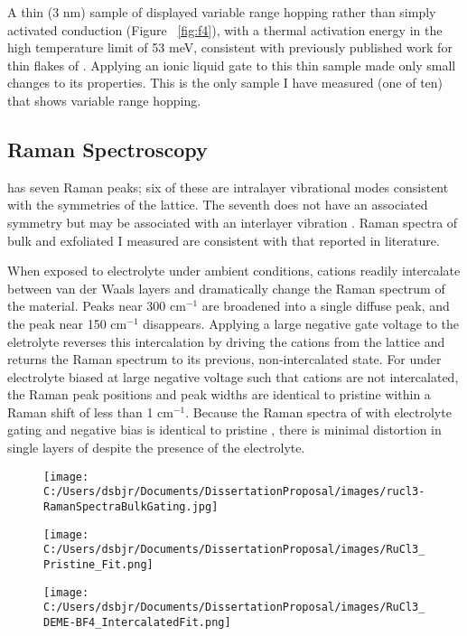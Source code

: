 \documentclass[11pt]{article}
\begin{document}
A thin (3 nm) sample of \rucl displayed variable range hopping rather than simply activated conduction (Figure ~\ref{fig:f4}), with a thermal activation energy in the high temperature limit of 53 meV, consistent with previously published work for thin flakes of \rucl \cite{Mashhadi2018}. Applying an ionic liquid gate to this thin sample made only small changes to its properties. This is the only sample I have measured (one of ten) that shows variable range hopping.

\subsection{Raman Spectroscopy}

\rucl has seven Raman peaks; six of these are intralayer vibrational modes consistent with the symmetries of the \rucl lattice. The seventh does not have an associated symmetry but may be associated with an interlayer vibration \cite{Zhou2018}. Raman spectra of bulk and exfoliated \rucl I measured are consistent with that reported in literature.

When exposed to electrolyte under ambient conditions, cations readily intercalate between van der Waals layers and dramatically change the Raman spectrum of the material. Peaks near 300 cm$^{-1}$ are broadened into a single diffuse peak, and the peak near 150 cm$^{-1}$ disappears. Applying a large negative gate voltage to the eletrolyte reverses this intercalation by driving the cations from the lattice and returns the Raman spectrum to its previous, non-intercalated state. For \rucl under electrolyte biased at large negative voltage such that cations are not intercalated, the Raman peak positions and peak widths are identical to pristine \rucl within a Raman shift of less than 1 cm$^{-1}$. Because the Raman spectra of \rucl with electrolyte gating and negative bias is identical to pristine \ruclnospace , there is minimal distortion in single layers of \rucl despite the presence of the electrolyte.

\begin{figure}
\centering 
  {\texttt{[image: C:/Users/dsbjr/Documents/DissertationProposal/images/rucl3-RamanSpectraBulkGating.jpg]}}
  \captionsetup{width=0.5\textwidth}
  \label{fig:f5}
\end{figure}
\begin{figure}
\centering
  {\texttt{[image: C:/Users/dsbjr/Documents/DissertationProposal/images/RuCl3\_Pristine\_Fit.png]}}
  \captionsetup{width=0.5\textwidth}
  \label{fig:f6}
\end{figure}
\begin{figure}
\centering
{\texttt{[image: C:/Users/dsbjr/Documents/DissertationProposal/images/RuCl3\_DEME-BF4\_IntercalatedFit.png]}}
\captionsetup{width=0.5\textwidth}
  \label{fig:f7}
\end{figure}
\end{document}
